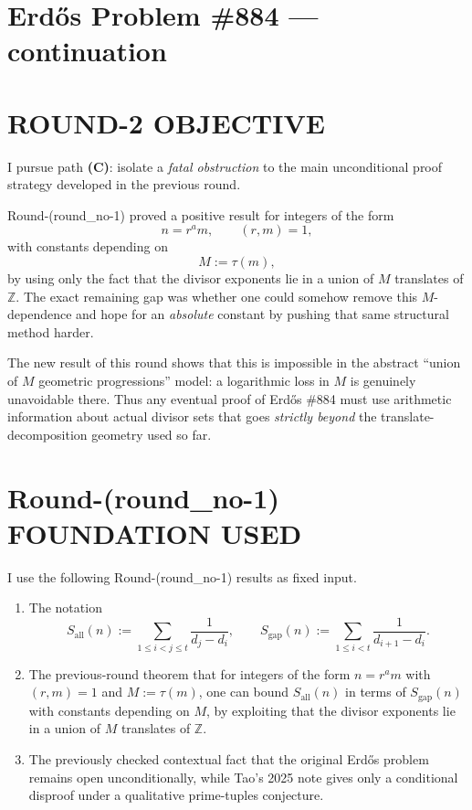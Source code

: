 
\section{Erd\H{o}s Problem \#884 --- continuation}

\section{ROUND-2 OBJECTIVE}

I pursue path \textbf{(C)}: isolate a \emph{fatal obstruction} to the main unconditional proof strategy developed in the previous round.

Round-(round\_no-1) proved a positive result for integers of the form
\[
n=r^a m,\qquad (r,m)=1,
\]
with constants depending on
\[
M:=\tau(m),
\]
by using only the fact that the divisor exponents lie in a union of \(M\) translates of \(\mathbb Z\). The exact remaining gap was whether one could somehow remove this \(M\)-dependence and hope for an \emph{absolute} constant by pushing that same structural method harder.

The new result of this round shows that this is impossible in the abstract ``union of \(M\) geometric progressions'' model: a logarithmic loss in \(M\) is genuinely unavoidable there. Thus any eventual proof of Erd\H{o}s \#884 must use arithmetic information about actual divisor sets that goes \emph{strictly beyond} the translate-decomposition geometry used so far.

\section{Round-(round\_no-1) FOUNDATION USED}

I use the following Round-(round\_no-1) results as fixed input.

\begin{enumerate}
\item The notation
\[
S_{\mathrm{all}}(n):=\sum_{1\le i<j\le t}\frac{1}{d_j-d_i},
\qquad
S_{\mathrm{gap}}(n):=\sum_{1\le i<t}\frac{1}{d_{i+1}-d_i}.
\]
\item The previous-round theorem that for integers of the form \(n=r^a m\) with \((r,m)=1\) and \(M:=\tau(m)\), one can bound \(S_{\mathrm{all}}(n)\) in terms of \(S_{\mathrm{gap}}(n)\) with constants depending on \(M\), by exploiting that the divisor exponents lie in a union of \(M\) translates of \(\mathbb Z\).
\item The previously checked contextual fact that the original Erd\H{o}s problem remains open unconditionally, while Tao's 2025 note gives only a conditional disproof under a qualitative prime-tuples conjecture.
\end{enumerate}

